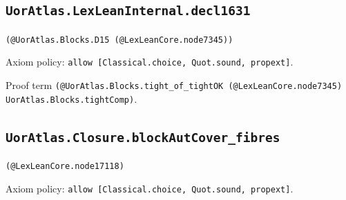 \documentclass[11pt]{article}
\begin{document}
\subsection*{\texttt{UorAtlas.LexLeanInternal.decl1631}}
\noindent\texttt{(@UorAtlas.Blocks.D15 (@LexLeanCore.node7345))}\par
\noindent Axiom policy: \texttt{allow [Classical.choice, Quot.sound, propext]}.\par
\noindent Proof term \texttt{(@UorAtlas.Blocks.tight\_of\_tightOK (@LexLeanCore.node7345) UorAtlas.Blocks.tightComp)}.\par
\subsection*{\texttt{UorAtlas.Closure.blockAutCover\_fibres}}
\noindent\texttt{(@LexLeanCore.node17118)}\par
\noindent Axiom policy: \texttt{allow [Classical.choice, Quot.sound, propext]}.\par
\end{document}
